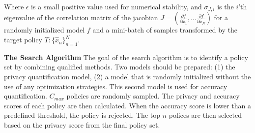 Where $\epsilon$ is a small positive value used for numerical stability, and $\sigma_{J,i}$ is the $i$'th eigenvalue of the correlation matrix of the jacobian $J=(\frac{\partial f}{\partial \hat x_1}, \dotso \frac{\partial f}{\partial \hat x_N})$ for a randomly initialized model $f$ and a mini-batch of samples transformed by the target policy $T: \{ \hat x_n \}_{n=1}^N$.


\textbf{The Search Algorithm}
The goal of the search algorithm is to identify a policy set by combining qualified methods. Two models should be prepared: (1) the privacy quantification model, (2) a model that is randomly initialized without the use of any optimization strategies. This second model is used for accuracy quantification. $C_{max}$ policies are randomly sampled. The privacy and accuracy scores of each policy are then calculated. When the accuracy score is lower than a predefined threshold, the policy is rejected. The top-$n$ polices are then selected based on the privacy score from the final policy set.


